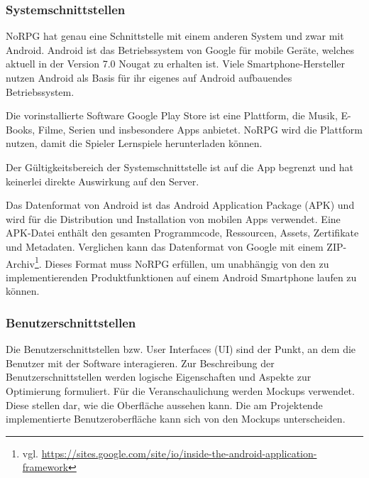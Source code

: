 	
		\subsubsection{Systemschnittstellen}
			NoRPG hat genau eine Schnittstelle mit einem anderen System und zwar mit Android. Android ist das Betriebssystem von Google für mobile Geräte, welches aktuell in der Version 7.0 Nougat zu erhalten ist. Viele Smartphone-Hersteller nutzen Android als Basis für ihr eigenes auf Android aufbauendes Betriebssystem. 
			
			Die vorinstallierte Software Google Play Store ist eine Plattform, die Musik, E-Books, Filme, Serien und insbesondere Apps anbietet. NoRPG wird die Plattform nutzen, damit die Spieler Lernspiele herunterladen können.
			
			Der Gültigkeitsbereich der Systemschnittstelle ist auf die App begrenzt und hat keinerlei direkte Auswirkung auf den Server. 
			
			Das Datenformat von Android ist das Android Application Package (APK) und wird für die Distribution und Installation von mobilen Apps verwendet. Eine APK-Datei enthält den gesamten Programmcode, Ressourcen, Assets, Zertifikate und Metadaten. Verglichen kann das Datenformat von Google mit einem ZIP-Archiv\footnote{vgl. \url{https://sites.google.com/site/io/inside-the-android-application-framework}}. Dieses Format muss NoRPG erfüllen, um unabhängig von den zu implementierenden Produktfunktionen auf einem Android Smartphone laufen zu können.
			
		\subsubsection{Benutzerschnittstellen}
			Die Benutzerschnittstellen bzw. User Interfaces (UI) sind der Punkt, an dem die Benutzer mit der Software interagieren. Zur Beschreibung der Benutzerschnittstellen werden logische Eigenschaften und Aspekte zur Optimierung formuliert. Für die Veranschaulichung werden Mockups verwendet. Diese stellen dar, wie die Oberfläche aussehen kann. Die am Projektende implementierte Benutzeroberfläche kann sich von den Mockups unterscheiden.
			
